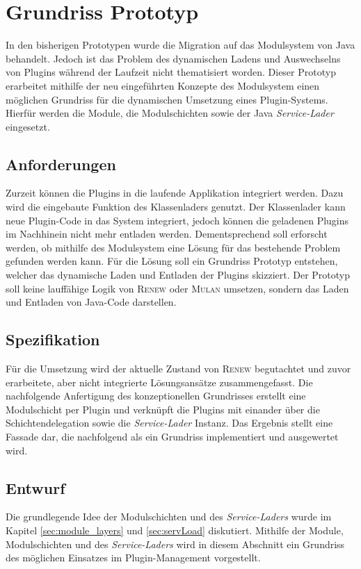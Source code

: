 \chapter{Grundriss Prototyp} 
	In den bisherigen Prototypen wurde die Migration auf das Modulsystem von Java behandelt. Jedoch ist das Problem des dynamischen Ladens und Auswechselns von Plugins während der Laufzeit nicht thematisiert worden. Dieser Prototyp erarbeitet mithilfe der neu eingeführten Konzepte des Modulsystem einen möglichen Grundriss für die dynamischen Umsetzung eines Plugin-Systems. Hierfür werden die Module, die Modulschichten sowie der Java \textit{Service-Lader} eingesetzt.

\section{Anforderungen} 
	Zurzeit können die Plugins in die laufende Applikation integriert werden. Dazu wird die eingebaute Funktion des Klassenladers genutzt. Der Klassenlader kann neue Plugin-Code in das System integriert, jedoch können die geladenen Plugins im Nachhinein nicht mehr entladen werden. Dementsprechend soll erforscht werden, ob mithilfe des Modulsystem eine Lösung für das bestehende Problem gefunden werden kann. Für die Lösung soll ein Grundriss Prototyp entstehen, welcher das dynamische Laden und Entladen der Plugins skizziert. Der Prototyp soll keine lauffähige Logik von \textsc{Renew} oder \textsc{Mulan} umsetzen, sondern das Laden und Entladen von Java-Code darstellen.

\section{Spezifikation} 
	Für die Umsetzung wird der aktuelle Zustand von \textsc{Renew} begutachtet und zuvor erarbeitete, aber nicht integrierte Lösungsansätze zusammengefasst. Die nachfolgende Anfertigung des konzeptionellen Grundrisses erstellt eine Modulschicht per Plugin und verknüpft die Plugins mit einander über die Schichtendelegation sowie die \textit{Service-Lader} Instanz. Das Ergebnis stellt eine Fassade dar, die nachfolgend als ein Grundriss implementiert und ausgewertet wird.

\section{Entwurf} \label{sec:entwurf}
	Die grundlegende Idee der Modulschichten und des \textit{Service-Laders} wurde im Kapitel \ref{sec:module_layers} und \ref{sec:servLoad} diskutiert. Mithilfe der Module, Modulschichten und des \textit{Service-Laders} wird in diesem Abschnitt ein Grundriss des möglichen Einsatzes im Plugin-Management vorgestellt.\bigbreak

